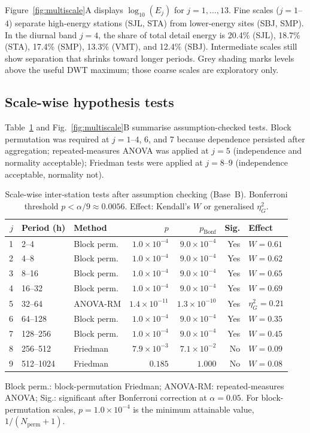 \documentclass[12pt,letterpaper]{article}
\begin{document}
Figure~\ref{fig:multiscale}A displays $\log_{10}(E_j)$ for $j=1,\ldots,13$. Fine scales ($j=1$--$4$) separate high-energy stations (SJL, STA) from lower-energy sites (SBJ, SMP). In the diurnal band $j=4$, the share of total detail energy is 20.4\% (SJL), 18.7\% (STA), 17.4\% (SMP), 13.3\% (VMT), and 12.4\% (SBJ). Intermediate scales still show separation that shrinks toward longer periods. Grey shading marks levels above the useful DWT maximum; those coarse scales are exploratory only.

\subsection{Scale-wise hypothesis tests}
\label{subsec:hypothesis}

Table~\ref{tab:tests} and Fig.~\ref{fig:multiscale}B summarise assumption-checked tests. Block permutation was required at $j=1$--$4$, 6, and 7 because dependence persisted after aggregation; repeated-measures ANOVA was applied at $j=5$ (independence and normality acceptable); Friedman tests were applied at $j=8$--$9$ (independence acceptable, normality not).

\begin{table}[t]
\centering
\caption{Scale-wise inter-station tests after assumption checking (Base~B). Bonferroni threshold $p<\alpha/9\approx 0.0056$. Effect: Kendall's $W$ or generalised $\eta_G^{2}$.}
\label{tab:tests}
\footnotesize
\setlength{\tabcolsep}{3.5pt}
\begin{tabular}{@{}rllrrrl@{}}
\toprule
$j$ & Period (h) & Method & $p$ & $p_{\mathrm{Bonf}}$ & Sig. & Effect \\
\midrule
1 & 2--4   & Block perm. & $1.0\times10^{-4}$ & $9.0\times10^{-4}$ & Yes & $W{=}0.61$ \\
2 & 4--8   & Block perm. & $1.0\times10^{-4}$ & $9.0\times10^{-4}$ & Yes & $W{=}0.62$ \\
3 & 8--16  & Block perm. & $1.0\times10^{-4}$ & $9.0\times10^{-4}$ & Yes & $W{=}0.65$ \\
4 & 16--32 & Block perm. & $1.0\times10^{-4}$ & $9.0\times10^{-4}$ & Yes & $W{=}0.69$ \\
5 & 32--64 & ANOVA-RM   & $1.4\times10^{-11}$ & $1.3\times10^{-10}$ & Yes & $\eta_G^{2}{=}0.21$ \\
6 & 64--128 & Block perm. & $1.0\times10^{-4}$ & $9.0\times10^{-4}$ & Yes & $W{=}0.35$ \\
7 & 128--256 & Block perm. & $1.0\times10^{-4}$ & $9.0\times10^{-4}$ & Yes & $W{=}0.45$ \\
8 & 256--512 & Friedman & $7.9\times10^{-3}$ & $7.1\times10^{-2}$ & No & $W{=}0.09$ \\
9 & 512--1024 & Friedman & $0.185$ & $1.000$ & No & $W{=}0.08$ \\
\bottomrule
\end{tabular}
\par\vspace{2pt}
\footnotesize Block perm.: block-permutation Friedman; ANOVA-RM: repeated-measures ANOVA; Sig.: significant after Bonferroni correction at $\alpha=0.05$. For block-permutation scales, $p=1.0\times10^{-4}$ is the minimum attainable value, $1/(N_{\mathrm{perm}}+1)$.
\end{table}
\end{document}
